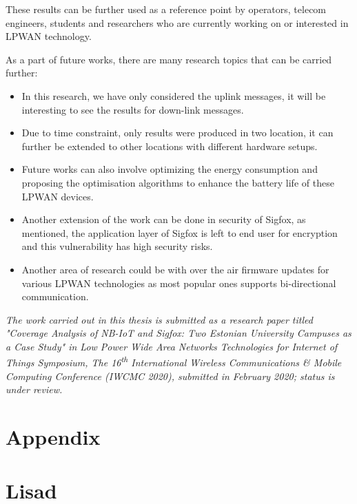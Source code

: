 \documentclass[12pt]{article}
\renewcommand{\refname}{Viidatud kirjandus}%
\renewcommand{\appendixname}{Lisad}%
\begin{document}
These results can be further used as a reference point by operators, telecom engineers, students and researchers who are currently working on or interested in LPWAN technology.\par 

As a part of future works, there are many research topics that can be carried further:
\begin{itemize}
    \item In this research, we have only considered the uplink messages, it will be interesting to see the results for down-link messages.
    \item Due to time constraint, only results were produced in two location, it can further be extended to other locations with different hardware setups.
    \item Future works can also involve optimizing the energy consumption and proposing the optimisation algorithms to enhance the battery life of these LPWAN devices.
    \item Another extension of the work can be done in security of Sigfox, as mentioned, the application layer of Sigfox is left to end user for encryption and this vulnerability has high security risks. 
    \item Another area of research could be with over the air firmware updates for various LPWAN technologies as most popular ones supports bi-directional communication.

\end{itemize}


\emph{The work carried out in this thesis is submitted as a research paper titled "Coverage Analysis of NB-IoT and Sigfox: Two Estonian University Campuses as a Case Study" in Low Power Wide Area Networks Technologies for Internet of Things Symposium, The 16\textsuperscript{th} International  Wireless Communications \& Mobile Computing Conference (IWCMC 2020), submitted in February 2020; status is under review.}




%

\addcontentsline{toc}{section}{\refname}


\newpage
%
  {\section*{Appendix}
  }%
  {\section*{Lisad}
  }
\end{document}
